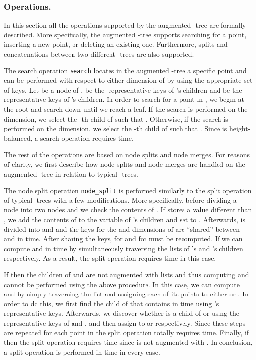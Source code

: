 \documentclass{llncs}
\begin{document}
\vspace{-0.5cm}
\subsubsection{Operations.} \label{subsubsection:AugABTreeOperations}
In this section all the operations supported by the augmented -tree are formally described. More specifically, the augmented -tree supports searching for a point, inserting a new point, or deleting an existing one. Furthermore, splits and concatenations between two different -trees are also supported.

The search operation \texttt{search} locates in the augmented -tree  a specific point  and can be performed with respect to either dimension of  by using the appropriate set of keys. Let  be a node of ,  be the -representative keys of 's children and  be the -representative keys of 's children. In order to search for a point  in , we begin at the root and search down until we reach a leaf. If the search is performed on the  dimension, we select the -th child of  such that . Otherwise, if the search is performed on the  dimension, we select the -th child of  such that . Since  is height-balanced, a search operation requires  time.

The rest of the operations are based on node splits and node merges. For reasons of clarity, we first describe how node splits and node merges are handled on the augmented -tree in relation to typical -trees.

The node split operation \texttt{node\_split} is performed similarly to the split operation of typical -trees with a few modifications. More specifically, before dividing a node  into two nodes  and  we check the contents of . If  stores a value different than , we add the contents of  to the  variable of 's children and set  to . Afterwards,  is divided into  and  and the keys for the  and  dimensions of  are ``shared'' between  and  in  time. After sharing the keys,  for  and  for  must be recomputed. If  we can compute  and  in  time by simultaneously traversing the   lists of 's and 's children respectively. As a result, the split operation requires  time in this case.

If  then the children of  and  are not augmented with  lists and thus computing  and  cannot be performed using the above procedure. In this case, we can compute  and  by simply traversing the  list and assigning each of its points  to either  or . In order to do this, we first find the child  of  that contains  in  time using 's representative keys. Afterwards, we discover whether  is a child of  or  using the representative keys of  and , and then assign  to  or  respectively. Since these steps are repeated for each point in  the split operation totally requires  time. Finally, if  then the split operation requires  time since  is not augmented with . In conclusion, a split operation is performed in  time in every case.
\end{document}
